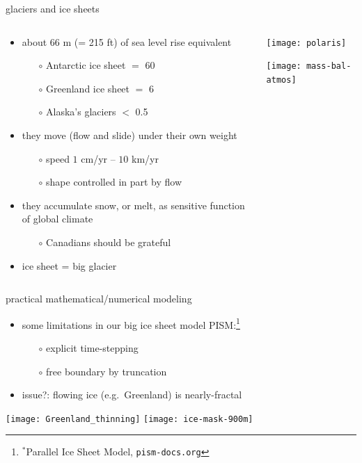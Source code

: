 \documentclass[xcolor={dvipsnames}]{beamer}
\begin{document}
\begin{frame}{glaciers and ice sheets}

\begin{columns}
\begin{column}{0.45\textwidth}
\begin{itemize}
\small
\item about 66 m (= 215 ft) of sea level rise equivalent
  \begin{itemize}
  \scriptsize
  \item[$\circ$] Antarctic ice sheet $=$ 60
  \item[$\circ$] Greenland ice sheet $=$ 6
  \item[$\circ$] Alaska's glaciers $<$ 0.5
  \end{itemize}
\small
\item they move (flow and slide) under their own weight
  \begin{itemize}
  \scriptsize
  \item[$\circ$] speed $1$ cm/yr -- $10$ km/yr
  \item[$\circ$] shape controlled in part by flow
  \end{itemize}
\small
\item they accumulate snow, or melt, as sensitive function of global climate
  \begin{itemize}
  \scriptsize
  \item[$\circ$] Canadians should be grateful
  \end{itemize}
\small
\item ice sheet = big glacier
\end{itemize}
\end{column}
\begin{column}{0.55\textwidth}
\texttt{[image: polaris]}

\texttt{[image: mass-bal-atmos]}
\end{column}
\end{columns}
\end{frame}


\begin{frame}{practical mathematical/numerical modeling}

\begin{itemize}
\small
\item some limitations in our big ice sheet model PISM:\footnote{$^*$Parallel Ice Sheet Model, \texttt{pism-docs.org}}
  \begin{itemize}
  \item[$\circ$] explicit time-stepping
  \item[$\circ$] free boundary by truncation
  \end{itemize}
\item issue?: flowing ice (e.g.~Greenland) is nearly-fractal
\end{itemize}

\begin{center}
\texttt{[image: Greenland\_thinning]} \quad \texttt{[image: ice-mask-900m]}
\end{center}
\end{frame}
\end{document}
